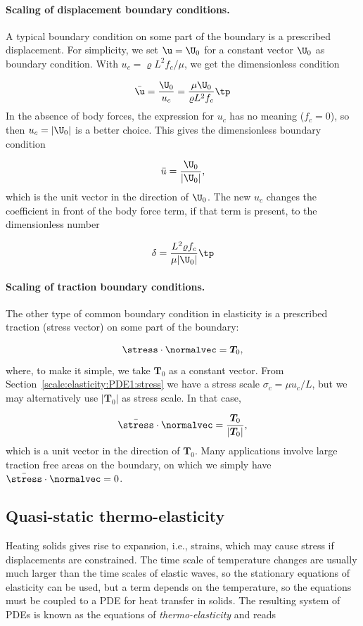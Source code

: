 \documentclass[graybox,envcountchap,sectrefs,final]{svmonodo}
\begin{document}
\paragraph{Scaling of displacement boundary conditions.}
A typical boundary condition on some part of the boundary is a prescribed
displacement. For simplicity, we set $\u = \U_0$ for a constant vector
$\U_0$ as boundary condition. With $u_c=\varrho L^2f_c/\mu$, we get
the dimensionless condition

\[ \bar\u = \frac{\U_0}{u_c} = \frac{\mu \U_0}{\varrho L^2f_c}\tp\]
In the absence of body forces, the expression for $u_c$ has no
meaning ($f_c=0$), so then $u_c = |\U_0|$ is a better choice.
This gives the dimensionless boundary condition

\[ \bar u = \frac{\U_0}{|\U_0|},\]
which is the unit vector in the direction of $\U_0$. The new $u_c$
changes the coefficient in front of the body force term, if that term
is present, to the dimensionless number

\[ \delta = \frac{L^2\varrho f_c}{\mu |\U_0|}\tp\]

\paragraph{Scaling of traction boundary conditions.}
The other type of common boundary condition in elasticity is a
prescribed traction (stress vector) on some part of the boundary:

\[ \stress\cdot\normalvec = \bm{T}_0,\]
where, to make it simple, we take $\bm{T}_0$ as a constant vector.
From Section~\ref{scale:elasticity:PDE1:stress} we have a stress scale
$\sigma_c = \mu u_c/L$, but we may alternatively use $|\bm{T}_0|$
as stress scale. In that case,

\[ \bar\stress\cdot\normalvec = \frac{\bm{T}_0}{|\bm{T}_0|},\]
which is a unit vector in the direction of $\bm{T}_0$.
Many applications involve large traction free areas on the boundary, on
which we simply have $\bar\stress\cdot\normalvec = 0$.


\subsection{Quasi-static thermo-elasticity}
\label{scale:elasticity:thermo}


Heating solids gives rise to expansion, i.e., strains, which may cause
stress if displacements are constrained. The time scale of temperature
changes are usually much larger than the time scales of elastic waves,
so the stationary equations of elasticity can be used, but a term
depends on the temperature, so the equations must be coupled to
a PDE for heat transfer in solids. The resulting system of PDEs is
known as the equations of \emph{thermo-elasticity} and reads
\end{document}
